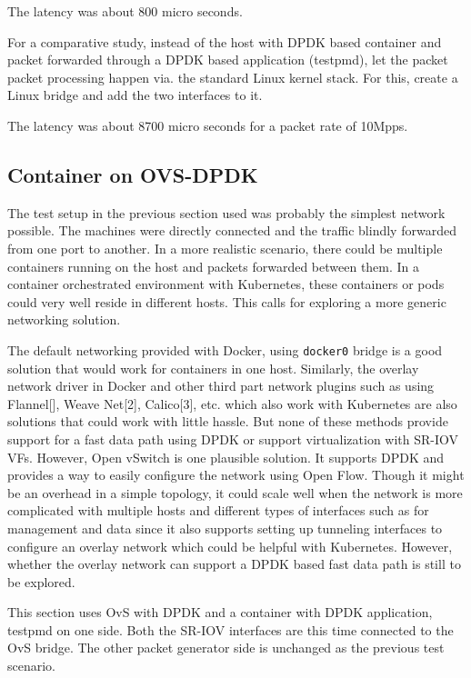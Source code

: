 \documentclass[english, 12pt, a4paper, elec, utf8, a-1b, online]{aaltothesis}
\begin{document}
The latency was about 800 micro seconds.

For a comparative study, instead of the host with DPDK based container and packet forwarded through a DPDK based application (testpmd), let the packet packet processing happen via. the standard Linux kernel stack. For this, create a Linux bridge and add the two interfaces to it.

The latency was about 8700 micro seconds for a packet rate of 10Mpps.

\subsection{Container on OVS-DPDK}
The test setup in the previous section used was probably the simplest network possible. The machines were directly connected and the traffic blindly forwarded from one port to another. In a more realistic scenario, there could be multiple containers running on the host and packets forwarded between them. In a container orchestrated environment with Kubernetes, these containers or pods could very well reside in different hosts. This calls for exploring a more generic networking solution.

The default networking provided with Docker, using \lstinline{docker0} bridge is a good solution that would work for containers in one host. Similarly, the overlay network driver in Docker and other third part network plugins such as using Flannel[], Weave Net[2], Calico[3], etc. which also work with Kubernetes are also solutions that could work with little hassle. But none of these methods provide support for a fast data path using DPDK or support virtualization with SR-IOV VFs. However, Open vSwitch is one plausible solution. It supports DPDK and provides a way to easily configure the network using Open Flow. Though it might be an overhead in a simple topology, it could scale well when the network is more complicated with multiple hosts and different types of interfaces such as for management and data since it also supports setting up tunneling interfaces to configure an overlay network which could be helpful with Kubernetes. However, whether the overlay network can support a DPDK based fast data path is still to be explored.

This section uses OvS with DPDK and a container with DPDK application, testpmd on one side. Both the SR-IOV interfaces are this time connected to the OvS bridge. The other packet generator side is unchanged as the previous test scenario.
\end{document}
